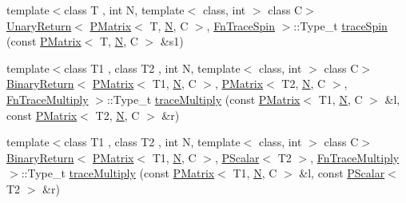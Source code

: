 \begin{DoxyCompactItemize}
\item 
{\footnotesize template$<$class T , int N, template$<$ class, int $>$ class C$>$ }\\\mbox{\hyperlink{structENSEM_1_1UnaryReturn}{Unary\+Return}}$<$ \mbox{\hyperlink{classENSEM_1_1PMatrix}{P\+Matrix}}$<$ T, \mbox{\hyperlink{operator__name__util_8cc_a7722c8ecbb62d99aee7ce68b1752f337}{N}}, C $>$, \mbox{\hyperlink{structENSEM_1_1FnTraceSpin}{Fn\+Trace\+Spin}} $>$\+::Type\+\_\+t \mbox{\hyperlink{group__primmatrix_gaaf91f3c1c18cadfc208acd80fd80ab0b}{trace\+Spin}} (const \mbox{\hyperlink{classENSEM_1_1PMatrix}{P\+Matrix}}$<$ T, \mbox{\hyperlink{operator__name__util_8cc_a7722c8ecbb62d99aee7ce68b1752f337}{N}}, C $>$ \&s1)
\item 
{\footnotesize template$<$class T1 , class T2 , int N, template$<$ class, int $>$ class C$>$ }\\\mbox{\hyperlink{structENSEM_1_1BinaryReturn}{Binary\+Return}}$<$ \mbox{\hyperlink{classENSEM_1_1PMatrix}{P\+Matrix}}$<$ T1, \mbox{\hyperlink{operator__name__util_8cc_a7722c8ecbb62d99aee7ce68b1752f337}{N}}, C $>$, \mbox{\hyperlink{classENSEM_1_1PMatrix}{P\+Matrix}}$<$ T2, \mbox{\hyperlink{operator__name__util_8cc_a7722c8ecbb62d99aee7ce68b1752f337}{N}}, C $>$, \mbox{\hyperlink{structENSEM_1_1FnTraceMultiply}{Fn\+Trace\+Multiply}} $>$\+::Type\+\_\+t \mbox{\hyperlink{group__primmatrix_ga91e09af0f8d2d70627950b973f6b41ec}{trace\+Multiply}} (const \mbox{\hyperlink{classENSEM_1_1PMatrix}{P\+Matrix}}$<$ T1, \mbox{\hyperlink{operator__name__util_8cc_a7722c8ecbb62d99aee7ce68b1752f337}{N}}, C $>$ \&l, const \mbox{\hyperlink{classENSEM_1_1PMatrix}{P\+Matrix}}$<$ T2, \mbox{\hyperlink{operator__name__util_8cc_a7722c8ecbb62d99aee7ce68b1752f337}{N}}, C $>$ \&r)
\item 
{\footnotesize template$<$class T1 , class T2 , int N, template$<$ class, int $>$ class C$>$ }\\\mbox{\hyperlink{structENSEM_1_1BinaryReturn}{Binary\+Return}}$<$ \mbox{\hyperlink{classENSEM_1_1PMatrix}{P\+Matrix}}$<$ T1, \mbox{\hyperlink{operator__name__util_8cc_a7722c8ecbb62d99aee7ce68b1752f337}{N}}, C $>$, \mbox{\hyperlink{classENSEM_1_1PScalar}{P\+Scalar}}$<$ T2 $>$, \mbox{\hyperlink{structENSEM_1_1FnTraceMultiply}{Fn\+Trace\+Multiply}} $>$\+::Type\+\_\+t \mbox{\hyperlink{group__primmatrix_gac4a39563bd9c9b587bd894f97f9e3fc4}{trace\+Multiply}} (const \mbox{\hyperlink{classENSEM_1_1PMatrix}{P\+Matrix}}$<$ T1, \mbox{\hyperlink{operator__name__util_8cc_a7722c8ecbb62d99aee7ce68b1752f337}{N}}, C $>$ \&l, const \mbox{\hyperlink{classENSEM_1_1PScalar}{P\+Scalar}}$<$ T2 $>$ \&r)

\end{DoxyCompactItemize}
